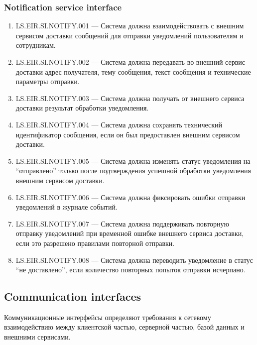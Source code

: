 \documentclass[12pt,a4paper]{article}
\begin{document}
	\subsubsection{Notification service interface}
	
	\begin{enumerate}
		\item LS.EIR.SI.NOTIFY.001 --- Система должна взаимодействовать с внешним сервисом
		доставки сообщений для отправки уведомлений пользователям и сотрудникам.
		
		\item LS.EIR.SI.NOTIFY.002 --- Система должна передавать во внешний сервис доставки
		адрес получателя, тему сообщения, текст сообщения и технические параметры
		отправки.
		
		\item LS.EIR.SI.NOTIFY.003 --- Система должна получать от внешнего сервиса доставки
		результат обработки уведомления.
		
		\item LS.EIR.SI.NOTIFY.004 --- Система должна сохранять технический идентификатор
		сообщения, если он был предоставлен внешним сервисом доставки.
		
		\item LS.EIR.SI.NOTIFY.005 --- Система должна изменять статус уведомления на
		``отправлено'' только после подтверждения успешной обработки уведомления
		внешним сервисом доставки.
		
		\item LS.EIR.SI.NOTIFY.006 --- Система должна фиксировать ошибки отправки
		уведомлений в журнале событий.
		
		\item LS.EIR.SI.NOTIFY.007 --- Система должна поддерживать повторную отправку
		уведомлений при временной ошибке внешнего сервиса доставки, если это разрешено
		правилами повторной отправки.
		
		\item LS.EIR.SI.NOTIFY.008 --- Система должна переводить уведомление в статус
		``не доставлено'', если количество повторных попыток отправки исчерпано.
	\end{enumerate}
	
	\subsection{Communication interfaces}
	
	Коммуникационные интерфейсы определяют требования к сетевому взаимодействию
	между клиентской частью, серверной частью, базой данных и внешними сервисами.
	
\end{document}
